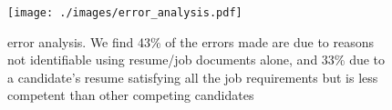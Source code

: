 \begin{figure}[!t]
    \centering
    \texttt{[image: ./images/error\_analysis.pdf]}
    \caption{\framework{} error analysis. We find 43\% of the errors made are due to reasons not identifiable using resume/job documents alone, and 33\% due to a candidate’s resume satisfying all the job requirements but is less competent than other competing candidates}
    \label{fig:error_analysis}
\end{figure}
